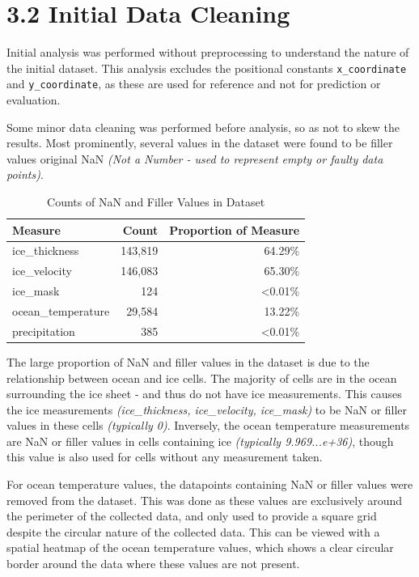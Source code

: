 \documentclass[11pt, a4paper, twoside, openright]{report}
\begin{document}
\section*{3.2 Initial Data Cleaning}
Initial analysis was performed without preprocessing to understand the nature of the initial dataset.
This analysis excludes the positional constants \texttt{x\_coordinate} and \texttt{y\_coordinate},
as these are used for reference and not for prediction or evaluation.

Some minor data cleaning was performed before analysis, so as not to skew the results.
Most prominently, several values in the dataset were found to be filler values original
NaN \textit{(Not a Number - used to represent empty or faulty data points)}.

\begin{table}[h!]
  \centering
  \begin{tabular}{|l|r|r|}
  \hline
  Measure & Count & Proportion of Measure \\ \hline
  ice\_thickness & 143,819 & 64.29\% \\ \hline
  ice\_velocity & 146,083 & 65.30\% \\ \hline
  ice\_mask & 124 & \textless{0.01}\% \\ \hline
  ocean\_temperature & 29,584 & 13.22\% \\ \hline
  precipitation & 385 & \textless{0.01}\% \\ \hline
  \end{tabular}
  \caption{Counts of NaN and Filler Values in Dataset}
  \label{table:measure_counts}
\end{table}
  
The large proportion of NaN and filler values in the dataset is due to the relationship between ocean and ice cells.
The majority of cells are in the ocean surrounding the ice sheet - and thus do not have ice measurements. This
causes the ice measurements \textit{(ice\_thickness, ice\_velocity, ice\_mask)} to be NaN or filler values in these cells
\textit{(typically 0)}. Inversely, the ocean temperature measurements are NaN or filler values in cells containing ice
\textit{(typically 9.969...e+36)}, though this value is also used for cells without any measurement taken.

For ocean temperature values, the datapoints containing NaN or filler values were removed from the dataset.
This was done as these values are exclusively around the perimeter of the collected data, and only used to 
provide a square grid despite the circular nature of the collected data. This can be viewed with a spatial
heatmap of the ocean temperature values, which shows a clear circular border around the data where these
values are not present.
\end{document}
